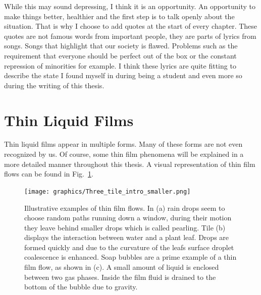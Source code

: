 While this may sound depressing, I think it is an opportunity.
An opportunity to make things better, healthier and the first step is to talk openly about the situation.
That is why I choose to add quotes at the start of every chapter.
These quotes are not famous words from important people, they are parts of lyrics from songs.
Songs that highlight that our society is flawed.
Problems such as the requirement that everyone should be perfect out of the box or the constant repression of minorities for example.
I think these lyrics are quite fitting to describe the state I found myself in during being a student and even more so during the writing of this thesis.

\section{Thin Liquid Films}
Thin liquid films appear in multiple forms. 
Many of these forms are not even recognized by us.
Of course, some thin film phenomena will be explained in a more detailed manner throughout this thesis. 
A visual representation of thin film flows can be found in Fig.~\ref{fig:examples_intro}.
\begin{figure}
    \centering
    \texttt{[image: graphics/Three\_tile\_intro\_smaller.png]}
    \caption{Illustrative examples of thin film flows. In (a) rain drops seem to choose random paths running down a window, during their motion they leave behind smaller drops which is called pearling. Tile (b) displays the interaction between water and a plant leaf. Drops are formed quickly and due to the curvature of the leafs surface droplet coalescence is enhanced. Soap bubbles are a prime example of a thin film flow, as shown in (c). A small amount of liquid is enclosed between two gas phases. Inside the film fluid is drained to the bottom of the bubble due to gravity.}
    \label{fig:examples_intro}
\end{figure}

